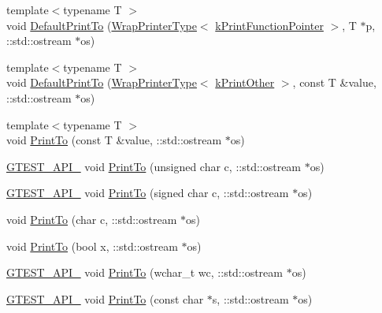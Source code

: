 \begin{DoxyCompactItemize}
\item 
{\footnotesize template$<$typename T $>$ }\\void \hyperlink{namespacetesting_1_1internal_a7729c07abcae6c69b9b370c39db61409}{Default\+Print\+To} (\hyperlink{structtesting_1_1internal_1_1WrapPrinterType}{Wrap\+Printer\+Type}$<$ \hyperlink{namespacetesting_1_1internal_a17fb8f0125fa92404a249ed38a43faa4a5a066cde30e276c6460ba10d123d0c2c}{k\+Print\+Function\+Pointer} $>$, T $\ast$p, \+::std\+::ostream $\ast$os)
\item 
{\footnotesize template$<$typename T $>$ }\\void \hyperlink{namespacetesting_1_1internal_a72b1a69d96be8ea6382539f5c4fcac6d}{Default\+Print\+To} (\hyperlink{structtesting_1_1internal_1_1WrapPrinterType}{Wrap\+Printer\+Type}$<$ \hyperlink{namespacetesting_1_1internal_a17fb8f0125fa92404a249ed38a43faa4a6f88d77d9d763d8a009caf950cfbab28}{k\+Print\+Other} $>$, const T \&value, \+::std\+::ostream $\ast$os)
\item 
{\footnotesize template$<$typename T $>$ }\\void \hyperlink{namespacetesting_1_1internal_adb3c27150dbe661db0e0c4be27533460}{Print\+To} (const T \&value, \+::std\+::ostream $\ast$os)
\item 
\hyperlink{gtest-port_8h_aa73be6f0ba4a7456180a94904ce17790}{G\+T\+E\+S\+T\+\_\+\+A\+P\+I\+\_\+} void \hyperlink{namespacetesting_1_1internal_aa7e70a85d66f0c109e3e69629ef577f2}{Print\+To} (unsigned char c, \+::std\+::ostream $\ast$os)
\item 
\hyperlink{gtest-port_8h_aa73be6f0ba4a7456180a94904ce17790}{G\+T\+E\+S\+T\+\_\+\+A\+P\+I\+\_\+} void \hyperlink{namespacetesting_1_1internal_abf6c518b437569187c1218166c702807}{Print\+To} (signed char c, \+::std\+::ostream $\ast$os)
\item 
void \hyperlink{namespacetesting_1_1internal_a476bd3d411d4f129620aaf8999c257c0}{Print\+To} (char c, \+::std\+::ostream $\ast$os)
\item 
void \hyperlink{namespacetesting_1_1internal_a2979ac1ad3e05c51dcd7dca2eb34e6ce}{Print\+To} (bool x, \+::std\+::ostream $\ast$os)
\item 
\hyperlink{gtest-port_8h_aa73be6f0ba4a7456180a94904ce17790}{G\+T\+E\+S\+T\+\_\+\+A\+P\+I\+\_\+} void \hyperlink{namespacetesting_1_1internal_a6c50fd437a2ae2ff6f182ccd6c2744dd}{Print\+To} (wchar\+\_\+t wc, \+::std\+::ostream $\ast$os)
\item 
\hyperlink{gtest-port_8h_aa73be6f0ba4a7456180a94904ce17790}{G\+T\+E\+S\+T\+\_\+\+A\+P\+I\+\_\+} void \hyperlink{namespacetesting_1_1internal_ac226053b96d7d61f9407e3b75bab07d9}{Print\+To} (const char $\ast$s, \+::std\+::ostream $\ast$os)

\end{DoxyCompactItemize}
